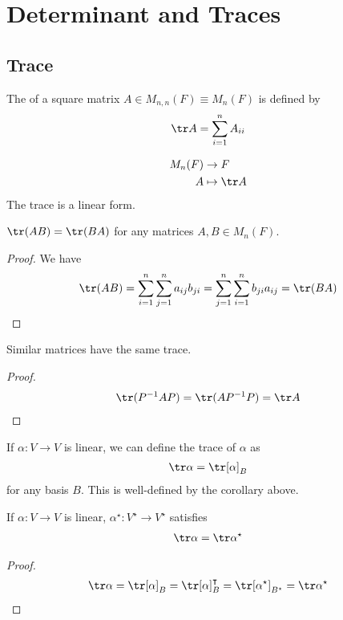 \section{Determinant and Traces}

\subsection{Trace}
\begin{definition}[Trace]
	The  of a square matrix $A \in M_{n,n}(F) \equiv M_n(F)$ is defined by
	\begin{align*}
		\tr A = \sum_{i=1}^n A_{ii}
	\end{align*}
\end{definition}

\begin{remark}
    \begin{align*}
        M_n(F) &\to F \\
        A &\mapsto \tr A
    \end{align*} 
    The trace is a linear form.
\end{remark} 

\begin{lemma}
	$\tr (AB) = \tr (BA)$ for any matrices $A, B \in M_n(F)$.
\end{lemma}

\begin{proof}
	We have
	\begin{align*}
		\tr (AB) = \sum_{i=1}^n \sum_{j=1}^n a_{ij} b_{ji} = \sum_{j=1}^n \sum_{i=1}^n b_{ji} a_{ij} = \tr (BA)
	\end{align*}
\end{proof}
\begin{corollary}
	Similar matrices have the same trace.
\end{corollary}
\begin{proof}
	\begin{align*}
		\tr(P^{-1}AP) = \tr (A P^{-1} P) = \tr A
	\end{align*}
\end{proof}
\begin{definition}
	If $\alpha \colon V \to V$ is linear, we can define the trace of $\alpha$ as
	\begin{align*}
		\tr \alpha = \tr [\alpha]_B
	\end{align*}
	for any basis $B$.
	This is well-defined by the corollary above.
\end{definition}
\begin{lemma}
	If $\alpha \colon V \to V$ is linear, $\alpha^\star \colon V^\star \to V^\star$ satisfies
	\begin{align*}
		\tr \alpha = \tr \alpha^\star
	\end{align*}
\end{lemma}
\begin{proof}
	\begin{align*}
		\tr \alpha = \tr [\alpha]_B = \tr [\alpha]_B^\transpose = \tr [\alpha^\star]_{B^\star} = \tr \alpha^\star
	\end{align*}
\end{proof}

